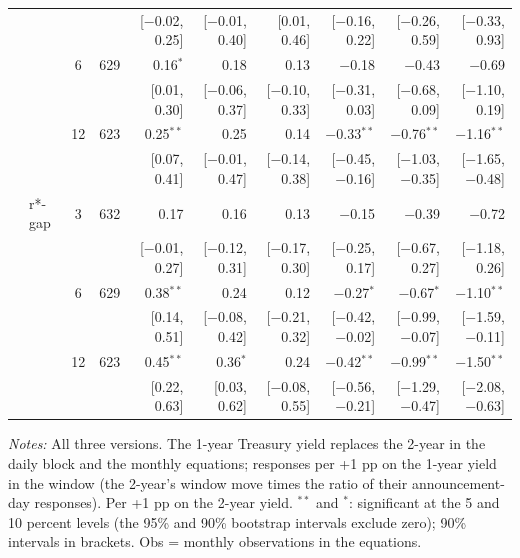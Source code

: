 \begin{longtable}{llcrrrrrrr}
 & & & & {\scriptsize [$-$0.02, 0.25]} & {\scriptsize [$-$0.01, 0.40]} & {\scriptsize [0.01, 0.46]} & {\scriptsize [$-$0.16, 0.22]} & {\scriptsize [$-$0.26, 0.59]} & {\scriptsize [$-$0.33, 0.93]}\\
 &  & 6 & 629 & 0.16$^{*}$ & 0.18 & 0.13 & $-$0.18 & $-$0.43 & $-$0.69\\
 & & & & {\scriptsize [0.01, 0.30]} & {\scriptsize [$-$0.06, 0.37]} & {\scriptsize [$-$0.10, 0.33]} & {\scriptsize [$-$0.31, 0.03]} & {\scriptsize [$-$0.68, 0.09]} & {\scriptsize [$-$1.10, 0.19]}\\
 &  & 12 & 623 & 0.25$^{**}$ & 0.25 & 0.14 & $-$0.33$^{**}$ & $-$0.76$^{**}$ & $-$1.16$^{**}$\\
 & & & & {\scriptsize [0.07, 0.41]} & {\scriptsize [$-$0.01, 0.47]} & {\scriptsize [$-$0.14, 0.38]} & {\scriptsize [$-$0.45, $-$0.16]} & {\scriptsize [$-$1.03, $-$0.35]} & {\scriptsize [$-$1.65, $-$0.48]}\\
 & r*-gap & 3 & 632 & 0.17 & 0.16 & 0.13 & $-$0.15 & $-$0.39 & $-$0.72\\
 & & & & {\scriptsize [$-$0.01, 0.27]} & {\scriptsize [$-$0.12, 0.31]} & {\scriptsize [$-$0.17, 0.30]} & {\scriptsize [$-$0.25, 0.17]} & {\scriptsize [$-$0.67, 0.27]} & {\scriptsize [$-$1.18, 0.26]}\\
 &  & 6 & 629 & 0.38$^{**}$ & 0.24 & 0.12 & $-$0.27$^{*}$ & $-$0.67$^{*}$ & $-$1.10$^{**}$\\
 & & & & {\scriptsize [0.14, 0.51]} & {\scriptsize [$-$0.08, 0.42]} & {\scriptsize [$-$0.21, 0.32]} & {\scriptsize [$-$0.42, $-$0.02]} & {\scriptsize [$-$0.99, $-$0.07]} & {\scriptsize [$-$1.59, $-$0.11]}\\
 &  & 12 & 623 & 0.45$^{**}$ & 0.36$^{*}$ & 0.24 & $-$0.42$^{**}$ & $-$0.99$^{**}$ & $-$1.50$^{**}$\\
 & & & & {\scriptsize [0.22, 0.63]} & {\scriptsize [0.03, 0.62]} & {\scriptsize [$-$0.08, 0.55]} & {\scriptsize [$-$0.56, $-$0.21]} & {\scriptsize [$-$1.29, $-$0.47]} & {\scriptsize [$-$2.08, $-$0.63]}\\
\end{longtable}
\begin{flushleft}\footnotesize\textit{Notes:} All three versions. The 1-year Treasury yield replaces the 2-year in the daily block and the monthly equations; responses per +1 pp on the 1-year yield in the window (the 2-year's window move times the ratio of their announcement-day responses). Per +1 pp on the 2-year yield. $^{**}$ and $^{*}$: significant at the 5 and 10 percent levels (the 95\% and 90\% bootstrap intervals exclude zero); 90\% intervals in brackets. Obs = monthly observations in the equations.\end{flushleft}
\endgroup
